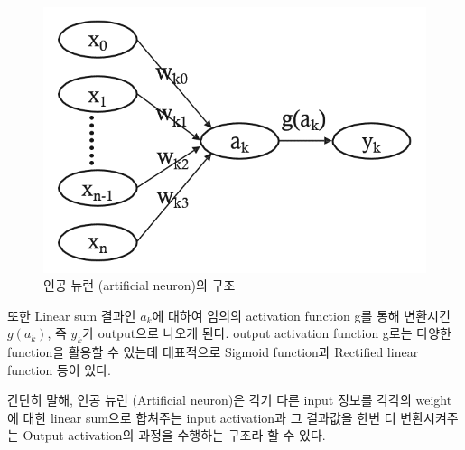 \documentclass[draft=false]{oblivoir}
\begin{document}
\begin{figure}[ht] \centering 
\includegraphics[scale=0.5]{fig14_2.png} 
\caption{인공 뉴런 (artificial neuron)의 구조}
\label{fig:14-2}
\end{figure}

또한 Linear sum 결과인 $a_{k}$에 대하여 임의의 activation function g를 통해 변환시킨 $g(a_{k})$, 즉 $y_{k}$가 output으로 나오게 된다. output activation function g로는 다양한 function을 활용할 수 있는데 대표적으로 Sigmoid function과 Rectified linear function 등이 있다.

간단히 말해, 인공 뉴런 (Artificial neuron)은 각기 다른 input 정보를 각각의 weight에 대한 linear sum으로 합쳐주는 input activation과 그 결과값을 한번 더 변환시켜주는 Output activation의 과정을 수행하는 구조라 할 수 있다. 
\end{document}
